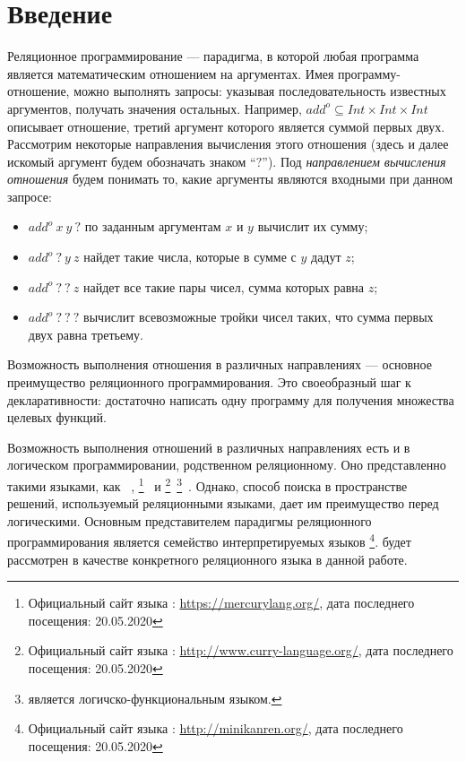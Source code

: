 \section*{Введение}

Реляционное программирование --- парадигма, в которой любая программа является математическим отношением на аргументах.
Имея программу-отношение, можно выполнять запросы: указывая последовательность известных аргументов, получать значения остальных.
Например, $add^o \subseteq Int \times Int \times Int$ описывает отношение, третий аргумент которого является суммой первых двух.
Рассмотрим некоторые направления вычисления этого отношения (здесь и далее искомый аргумент будем обозначать знаком ``$?$'').
Под \emph{направлением вычисления отношения} будем понимать то, какие аргументы являются входными при данном запросе:
\begin{itemize}
    \item $add^o \ x \ y \ ?$ по заданным аргументам $x$ и $y$ вычислит их сумму;
    \item $add^o \ ? \ y \ z$ найдет такие числа, которые в сумме с $y$ дадут $z$;
    \item $add^o \ ? \ ? \ z$ найдет все такие пары чисел, сумма которых равна $z$;
    \item $add^o \ ? \ ? \ ?$ вычислит всевозможные тройки чисел таких, что сумма первых двух равна третьему.
\end{itemize}

Возможность выполнения отношения в различных направлениях --- основное преимущество реляционного программирования.
Это своеобразный шаг к декларативности: достаточно написать одну программу для получения множества целевых функций.

Возможность выполнения отношений в различных направлениях есть и в логическом программировании, родственном реляционному.
Оно представленно такими языками, как \prolog{}~\cite{Malpas1987prolog}, \mercury{}\footnote{Официальный сайт языка \mercury{}: \url{https://mercurylang.org/}, дата последнего посещения: 20.05.2020}~\cite{SOMOGYI199617} и \curry{}\footnote{Официальный сайт языка \curry{}: \url{http://www.curry-language.org/}, дата последнего посещения: 20.05.2020}~\footnote{\curry{} является логичско-функциональным языком.}~\cite{Hanus2016CIF}.
Однако, способ поиска в пространстве решений, используемый реляционными языками, дает им преимущество перед логическими.
Основным представителем парадигмы реляционного программирования является семейство интерпретируемых языков \miniKanren{}\footnote{Официальный сайт языка \miniKanren{}: \url{http://minikanren.org/}, дата последнего посещения: 20.05.2020}.
\miniKanren{} будет рассмотрен в качестве конкретного реляционного языка в данной работе.

